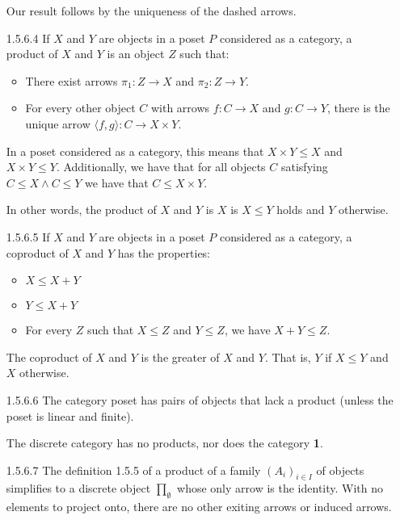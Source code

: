 \documentclass{article}
\begin{document}
\begin{enumerate}
  Our result follows by the uniqueness of the dashed arrows.

\item[]
\item [1.5.6.4]
  If $X$ and $Y$ are objects in a poset $P$ considered as a category, a product of $X$ and $Y$ is an object $Z$ such that:
  \begin{itemize}
  \item There exist arrows $\pi_1 : Z \rightarrow X$ and $\pi_2 : Z \rightarrow Y$.
  \item For every other object $C$ with arrows $f : C \rightarrow X$ and $g : C \rightarrow Y$, there is the unique arrow $\langle f , g \rangle : C \rightarrow X \times Y$.
  \end{itemize}
  In a poset considered as a category, this means that $X \times Y \le X$ and $X \times Y \le Y$.
  Additionally, we have that for all objects $C$ satisfying $C \le X \wedge C \le Y$ we have that $C \le X \times Y$.

  In other words, the product of $X$ and $Y$ is $X$ is $X \le Y$ holds and $Y$ otherwise.

\item[]
\item [1.5.6.5]
  If $X$ and $Y$ are objects in a poset $P$ considered as a category, a coproduct of $X$ and $Y$ has the properties:
  \begin{itemize}
  \item $X \le X + Y$
  \item $Y \le X + Y$
  \item For every $Z$ such that $X \le Z$ and $Y \le Z$, we have $X + Y \le Z$.
  \end{itemize}

  The coproduct of $X$ and $Y$ is the greater of $X$ and $Y$.
  That is, $Y$ if $X \le Y$ and $X$ otherwise.

\item[]
\item [1.5.6.6]
  The category poset has pairs of objects that lack a product (unless the poset is linear and finite).

  The discrete category has no products, nor does the category \textbf{1}.

\item[]
\item [1.5.6.7]
  The definition 1.5.5 of a product of a family $(A_i)_{i\in I}$ of objects simplifies to a discrete object $\prod_\emptyset$ whose only arrow is the identity.
  With no elements to project onto, there are no other exiting arrows or induced arrows.

\end{enumerate}
\end{document}
